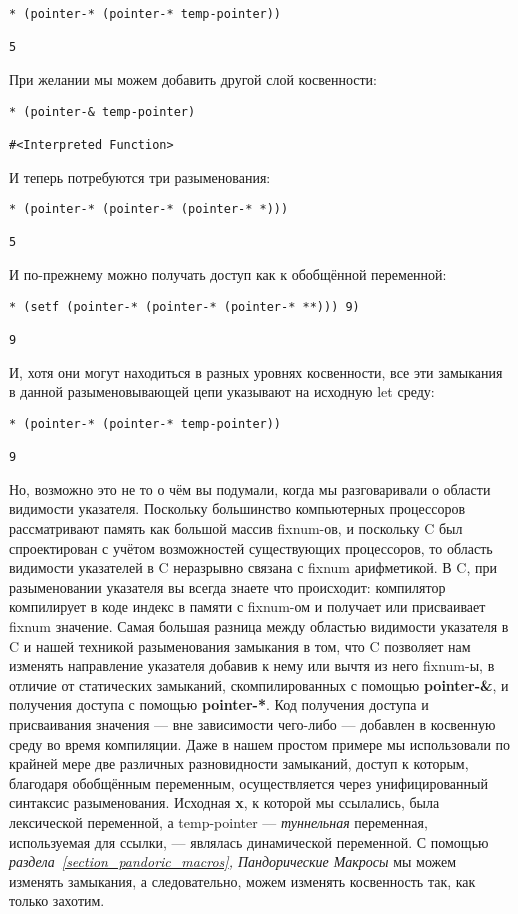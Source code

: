 \begin{verbatim}
* (pointer-* (pointer-* temp-pointer))

5
\end{verbatim}

При желании мы можем добавить другой слой косвенности:

\begin{verbatim}
* (pointer-& temp-pointer)

#<Interpreted Function>
\end{verbatim}

И теперь потребуются три разыменования:

\begin{verbatim}
* (pointer-* (pointer-* (pointer-* *)))

5
\end{verbatim}

И по-прежнему можно получать доступ как к обобщённой переменной:

\begin{verbatim}
* (setf (pointer-* (pointer-* (pointer-* **))) 9)

9
\end{verbatim}

И, хотя они могут находиться в разных уровнях косвенности, все эти замыкания в данной разыменовывающей цепи указывают на исходную let среду:

\begin{verbatim}
* (pointer-* (pointer-* temp-pointer))

9
\end{verbatim}

Но, возможно это не то о чём вы подумали, когда мы разговаривали о области видимости указателя. Поскольку большинство компьютерных процессоров рассматривают память как большой массив fixnum-ов, и поскольку C был спроектирован с учётом возможностей существующих процессоров, то область видимости указателей в C неразрывно связана с fixnum арифметикой. В C, при разыменовании указателя вы всегда знаете что происходит: компилятор компилирует в коде индекс в памяти с fixnum-ом и получает или присваивает fixnum значение. Самая большая разница между областью видимости указателя в C и нашей техникой разыменования замыкания в том, что C позволяет нам изменять направление указателя добавив к нему или вычтя из него fixnum-ы, в отличие от статических замыканий, скомпилированных с помощью \textbf{pointer-\&}, и получения доступа с помощью \textbf{pointer-*}. Код получения доступа и присваивания значения --- вне зависимости чего-либо --- добавлен в косвенную среду во время компиляции. Даже в нашем простом примере мы использовали по крайней мере две различных разновидности замыканий, доступ к которым, благодаря обобщённым переменным, осуществляется через унифицированный синтаксис разыменования. Исходная \textbf{x}, к которой мы ссылались, была лексической переменной, а temp-pointer --- \emph{туннельная} переменная, используемая для ссылки, --- являлась динамической переменной. С помощью \emph{раздела~\ref{section_pandoric_macros}, Пандорические Макросы} мы можем изменять замыкания, а следовательно, можем изменять косвенность так, как только захотим.

